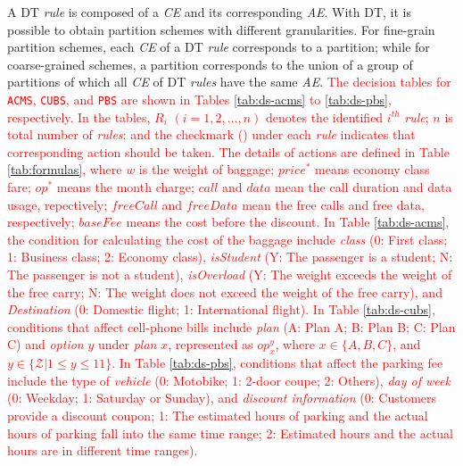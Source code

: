 \documentclass[10pt,journal,compsoc]{IEEEtran}
\begin{document}
A DT \emph{rule} is composed of a \emph{CE} and its corresponding \emph{AE}.
With DT, it is possible to obtain partition schemes with different granularities.
For fine-grain partition schemes, each \emph{CE} of a DT \emph{rule} corresponds to a partition;
while for coarse-grained schemes, a partition corresponds to the union of a group of partitions of which all \emph{CE} of DT \emph{rules} have the same \emph{AE}.
\textcolor{red}{The decision tables for \texttt{ACMS}, \texttt{CUBS}, and \texttt{PBS} are shown in Tables \ref{tab:ds-acms} to \ref{tab:ds-pbs}, respectively. In the tables, $R_i$ $(i = 1, 2, \ldots, n)$ denotes the identified $i^{th}$ \emph{rule}; $n$ is total number of \emph{rules}; and the checkmark (\checkmark) under each \emph{rule} indicates that corresponding action should be taken.
The details of actions are defined in Table \ref{tab:formulas}, where $w$ is the weight of baggage; $price^*$ means economy class fare; $op^*$ means the month charge; $call$ and $data$ mean the call duration and data usage, repectively; $freeCall$ and $freeData$ mean the free calls and free data, respectively; $baseFee$ means the cost before the discount. In Table \ref{tab:ds-acms}, the condition for calculating the cost of the baggage include \emph{class} (0: First class; 1: Business class; 2: Economy class), \emph{isStudent} (Y: The passenger is a student; N: The passenger is not a student), \emph{isOverload} (Y: The weight exceeds the weight of the free carry; N: The weight does not exceed the weight of the free carry), and \emph{Destination} (0: Domestic flight; 1: International flight). In Table \ref{tab:ds-cubs}, conditions that affect cell-phone bills include \emph{plan} (A: Plan A; B: Plan B; C: Plan C) and \emph{option} $y$ under \emph{plan} $x$, represented as $op_x^y$, where $x \in \{A, B, C\}$, and $y \in \{\mathcal{Z} |1 \le y \le 11\}$. In Table \ref{tab:ds-pbs}, conditions that affect the parking fee include the type of \emph{vehicle} (0: Motobike; 1: 2-door coupe; 2: Others), \emph{day of week} (0: Weekday; 1: Saturday or Sunday), and \emph{discount information} (0: Customers provide a discount coupon; 1: The estimated hours of parking and the actual hours of parking fall into the same time range; 2: Estimated hours and the actual hours are in different time ranges).}
\end{document}
